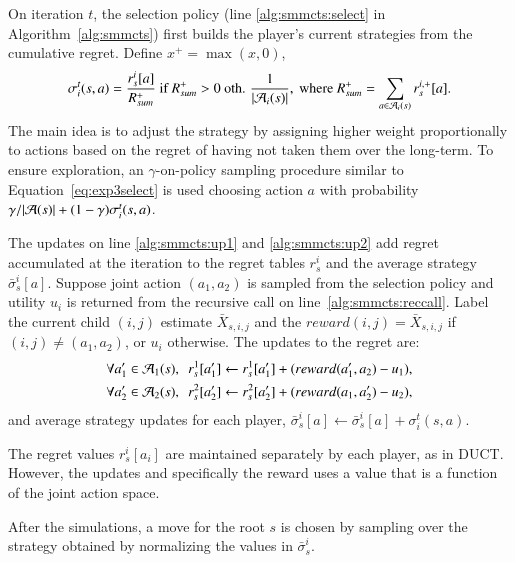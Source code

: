 On iteration $t$, the selection policy (line \ref{alg:smmcts:select} in Algorithm~\ref{alg:smmcts}) first builds
the player's current strategies from the cumulative regret. Define $x^+ = \max(x,0)$,
\begin{equation}
\label{eq:rm}
\sigma^t_i(s,a) = \frac{r^i_s[a]}{R^+_{sum}} \mbox{ if } R^+_{sum} > 0 
\mbox{ oth. } \frac{1}{|\mathcal{A}_i(s)|}, \mbox{ where } R^+_{sum} = \sum_{a \in \mathcal{A}_i(s)}{r^{i,+}_s[a]}. 
\end{equation}
The main idea is to adjust the strategy by assigning higher weight proportionally to actions based on the regret of
having not taken them over the long-term.
To ensure exploration, an $\gamma$-on-policy sampling procedure similar to Equation~\ref{eq:exp3select} is used
choosing action $a$ with probability $\gamma/|\mathcal{A}(s)| + (1-\gamma) \sigma^t_i(s,a)$.

The updates on line \ref{alg:smmcts:up1} and \ref{alg:smmcts:up2} add regret accumulated at the iteration to
the regret tables $r^i_s$ and the average strategy $\bar{\sigma}^i_s[a]$. Suppose joint action $(a_1,a_2)$ is
sampled from the selection policy and utility $u_i$ is returned from the recursive call on line~\ref{alg:smmcts:reccall}.
Label the current child $(i,j)$ estimate $\bar{X}_{s,i,j}$ and the $reward(i,j) = \bar{X}_{s,i,j}$ if
$(i,j) \not= (a_1,a_2)$, or $u_i$ otherwise. The updates to the regret are:
\begin{eqnarray*}
\forall a_1' \in \mathcal{A}_1(s), ~~  r^1_s[a_1'] \leftarrow r^1_s[a_1'] + ( reward(a_1', a_2) - u_1 ),\\
\forall a_2' \in \mathcal{A}_2(s), ~~  r^2_s[a_2'] \leftarrow r^2_s[a_2'] + ( reward(a_1, a_2') - u_2 ),
\end{eqnarray*}
\noindent and average strategy updates for each player, $\bar{\sigma}^i_s[a] \leftarrow \bar{\sigma}^i_s[a] + \sigma^t_i(s,a).$

The regret values $r^i_s[a_i]$ are maintained separately by each player, as in DUCT. 
However, the updates and specifically the reward uses a value that is a function of the joint action space.

After the simulations, a move for the root $s$ is chosen by sampling over the strategy obtained by
normalizing the values in $\bar{\sigma}_s^i$.

